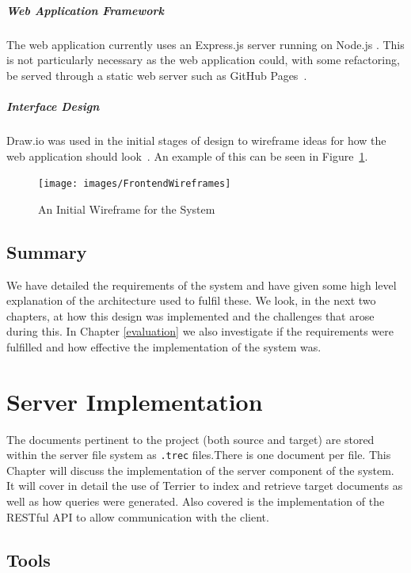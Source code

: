 \documentclass{l4proj}
\newcommand{\code}[1]{\texttt{#1}}
\begin{document}
\paragraph{Web Application Framework}
The web application currently uses an Express.js server running on Node.js \cite{express,node}. This is not particularly necessary as the web application could, with some refactoring, be served through a static web server such as GitHub Pages~\cite{githubpages}.

\paragraph{Interface Design}
Draw.io was used in the initial stages of design to wireframe ideas for how the web application should look~\cite{drawio}. An example of this can be seen in Figure~\ref{wireframes}.
\begin{figure}[H]
\centering
\texttt{[image: images/FrontendWireframes]}
\caption{An Initial Wireframe for the System}
\label{wireframes}
\end{figure}

\section{Summary}
We have detailed the requirements of the system and have given some high level explanation of the architecture used to fulfil these. We look, in the next two chapters, at how this design was implemented and the challenges that arose during this. In Chapter \ref{evaluation} we also investigate if the requirements were fulfilled and how effective the implementation of the system was.

\chapter{Server Implementation} \label{serverimplementation}
The documents pertinent to the project (both source and target) are stored within the server file system as \code{.trec} files.There is one document per file.
This Chapter will discuss the implementation of the server component of the system. It will cover in detail the use of Terrier to index and retrieve target documents as well as how queries were generated. Also covered is the implementation of the RESTful API to allow communication with the client.

\section{Tools}
\end{document}
